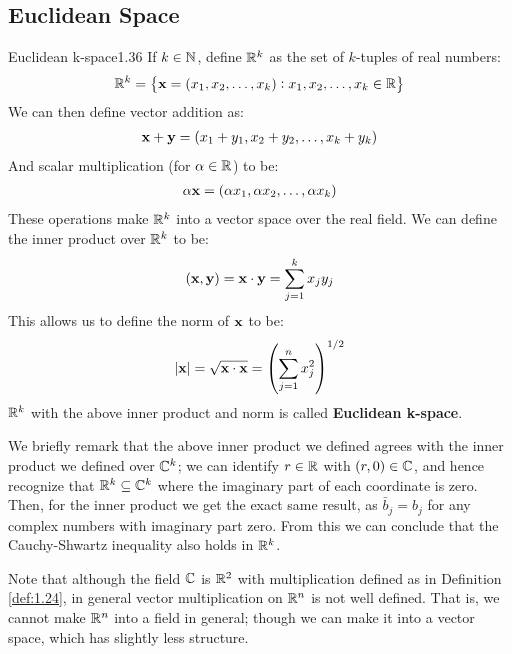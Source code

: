 \subsection{Euclidean Space}
\begin{definition}{Euclidean k-space}{1.36}
    If $k \in \mathbb{N}$, define $\mathbb{R}^k$ as the set of $k$-tuples of real numbers:
    \begin{align*}
        \mathbb{R}^k = \set{\ensuremath{\mathbf{x}} = (x_1, x_2, \ldots, x_k): x_1, x_2, \ldots, x_k \in \mathbb{R}}
    \end{align*}
    We can then define vector addition as:
    \begin{align*}
        \mathbf{x} + \mathbf{y} = (x_1 + y_1, x_2 + y_2, \ldots, x_k + y_k)
    \end{align*}
    And scalar multiplication (for $\alpha \in \mathbb{R}$) to be:
    \begin{align*}
        \alpha\mathbf{x} = (\alpha x_1, \alpha x_2, \ldots, \alpha x_k)
    \end{align*}
    These operations make $\mathbb{R}^k$ into a vector space over the real field. We can define the inner product over $\mathbb{R}^k$ to be:
    \begin{align*}
        (\mathbf{x}, \mathbf{y}) = \mathbf{x} \cdot \mathbf{y} = \sum_{j=1}^k x_jy_j
    \end{align*}
    This allows us to define the norm of $\mathbf{x}$ to be:
    \begin{align*}
        \abs{\mathbf{x}} = \sqrt{\mathbf{x} \cdot \mathbf{x}} = \left(\sum_{j=1}^n x_j^2\right)^{1/2}
    \end{align*}
    $\mathbb{R}^k$ with the above inner product and norm is called \textbf{Euclidean k-space}.
\end{definition}
\noindent We briefly remark that the above inner product we defined agrees with the inner product we defined over $\mathbb{C}^k$; we can identify $r \in \mathbb{R}$ with $(r, 0) \in \mathbb{C}$, and hence recognize that $\mathbb{R}^k \subseteq \mathbb{C}^k$ where the imaginary part of each coordinate is zero. Then, for the inner product we get the exact same result, as $\bar{b}_j = b_j$ for any complex numbers with imaginary part zero. From this we can conclude that the Cauchy-Shwartz inequality also holds in $\mathbb{R}^k$. 

Note that although the field $\mathbb{C}$ is $\mathbb{R}^2$ with multiplication defined as in Definition \ref{def:1.24}, in general vector multiplication on $\mathbb{R}^n$ is not well defined. That is, we cannot make $\mathbb{R}^n$ into a field in general; though we can make it into a vector space, which has slightly less structure.

